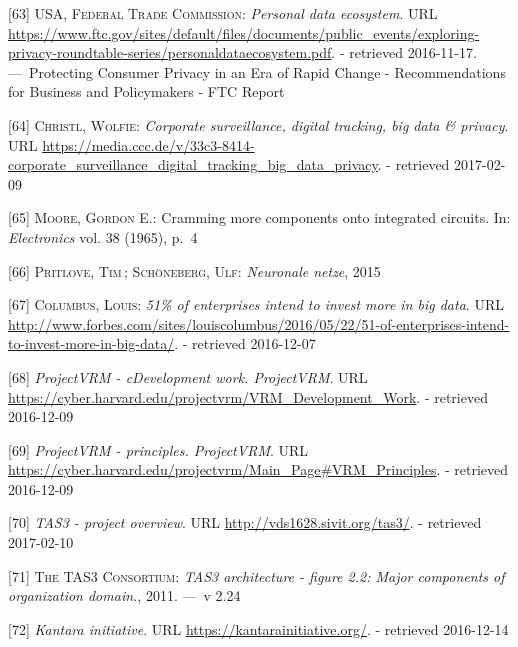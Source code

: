 \documentclass[12pt,english,a4paper,titlepage,cleardoublepage=empty,dottedtoc]{report}
\begin{document}
\hypertarget{ref-graphic_2012_personal-data-ecosystem}{}
{[}63{]} \textsc{USA, Federal Trade Commission}: \emph{Personal data
ecosystem}. URL
\url{https://www.ftc.gov/sites/default/files/documents/public_events/exploring-privacy-roundtable-series/personaldataecosystem.pdf}.
- retrieved 2016-11-17. ---~Protecting Consumer Privacy in an Era of
Rapid Change - Recommendations for Business and Policymakers - FTC
Report

\hypertarget{ref-video_2016_corporate-surveillance-digital-tracking-big-data-privacy}{}
{[}64{]} \textsc{Christl, Wolfie}: \emph{Corporate surveillance, digital
tracking, big data \& privacy}. URL
\url{https://media.ccc.de/v/33c3-8414-corporate_surveillance_digital_tracking_big_data_privacy}.
- retrieved 2017-02-09

\hypertarget{ref-paper_1965_moors-law}{}
{[}65{]} \textsc{Moore, Gordon E.}: Cramming more components onto
integrated circuits. In: \emph{Electronics} vol. 38 (1965), p.~4

\hypertarget{ref-podcast_2015_cre-neuronale-netze}{}
{[}66{]} \textsc{Pritlove, Tim}\,; \textsc{Schöneberg, Ulf}:
\emph{Neuronale netze}, 2015

\hypertarget{ref-web_2016_industries-intention-to-invest-in-big-data}{}
{[}67{]} \textsc{Columbus, Louis}: \emph{51\% of enterprises intend to
invest more in big data}. URL
\url{http://www.forbes.com/sites/louiscolumbus/2016/05/22/51-of-enterprises-intend-to-invest-more-in-big-data/}.
- retrieved 2016-12-07

\hypertarget{ref-web_2016_projectvrm_development-work}{}
{[}68{]} \emph{ProjectVRM - cDevelopment work. ProjectVRM}. URL
\url{https://cyber.harvard.edu/projectvrm/VRM_Development_Work}. -
retrieved 2016-12-09

\hypertarget{ref-web_2016_projectvrm_principles}{}
{[}69{]} \emph{ProjectVRM - principles. ProjectVRM}. URL
\url{https://cyber.harvard.edu/projectvrm/Main_Page\#VRM_Principles}. -
retrieved 2016-12-09

\hypertarget{ref-web_2011_tas3-project}{}
{[}70{]} \emph{TAS3 - project overview}. URL
\url{http://vds1628.sivit.org/tas3/}. - retrieved 2017-02-10

\hypertarget{ref-graphic_2011_architecture_components-of-organization-domain}{}
{[}71{]} \textsc{The TAS3 Consortium}: \emph{TAS3 architecture - figure
2.2: Major components of organization domain.}, 2011. ---~v 2.24

\hypertarget{ref-web_kantara-initiative}{}
{[}72{]} \emph{Kantara initiative}. URL
\url{https://kantarainitiative.org/}. - retrieved 2016-12-14
\end{document}
